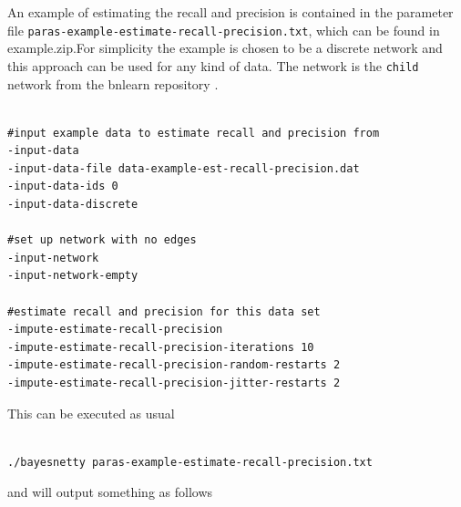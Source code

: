 \documentclass[a4paper,12pt]{article}
\newcommand{\code}[1]{{\footnotesize{{\tt #1}}}}
\begin{document}
An example of estimating the recall and precision is contained in the parameter file \code{paras-example-estimate-recall-precision.txt}, which can be found in example.zip.For simplicity the example is chosen to be a discrete network and this approach can be used for any kind of data. The network is the \code{child} network from the bnlearn repository \citet{bnlearn}. 
\vspace{0.35cm} \begin{lstlisting}

#input example data to estimate recall and precision from
-input-data
-input-data-file data-example-est-recall-precision.dat
-input-data-ids 0
-input-data-discrete

#set up network with no edges
-input-network
-input-network-empty

#estimate recall and precision for this data set
-impute-estimate-recall-precision
-impute-estimate-recall-precision-iterations 10
-impute-estimate-recall-precision-random-restarts 2
-impute-estimate-recall-precision-jitter-restarts 2

\end{lstlisting} \vspace{0.35cm}
This can be executed as usual 
\vspace{0.35cm} \begin{lstlisting}

./bayesnetty paras-example-estimate-recall-precision.txt

\end{lstlisting} \vspace{0.35cm}
and will output something as follows 
\end{document}

